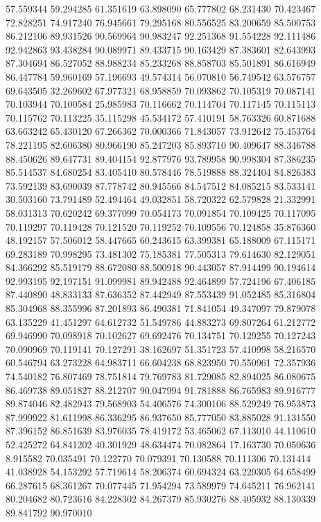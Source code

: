57.559344
59.294285
61.351619
63.898090
65.777802
68.231430
70.423467
72.828251
74.917240
76.945661
79.295168
80.556525
83.200659
85.500753
86.212106
89.931526
90.569964
90.983247
92.251368
91.554228
92.111486
92.942863
93.438284
90.089971
89.433715
90.163429
87.383601
82.643993
87.304694
86.527052
88.988234
85.233268
88.858703
85.501891
86.616949
86.447784
59.960169
57.196693
49.574314
56.070810
56.749542
63.576757
69.643505
32.269602
67.977321
68.958859
70.093862
70.105319
70.087141
70.103944
70.100584
25.985983
70.116662
70.114704
70.117145
70.115113
70.115762
70.113225
35.115298
45.534172
57.410191
58.763326
60.871688
63.663242
65.430120
67.266362
70.000366
71.843057
73.912642
75.453764
78.221195
82.606380
80.966190
85.247203
85.893710
90.409647
88.346788
88.450626
89.647731
89.404154
92.877976
93.789958
90.998304
87.386235
85.514537
84.680254
83.405410
80.578446
78.519888
88.324404
84.826383
73.592139
83.690039
87.778742
80.945566
84.547512
84.085215
83.533141
30.503160
73.791489
52.494464
49.032851
58.720322
62.579828
21.332991
58.031313
70.620242
69.377099
70.054173
70.091854
70.109425
70.117095
70.119297
70.119428
70.121520
70.119252
70.109556
70.124858
35.876360
48.192157
57.506012
58.447665
60.243615
63.399381
65.188009
67.115171
69.283189
70.998295
73.481302
75.185381
77.505313
79.614630
82.129051
84.366292
85.519179
88.672080
88.500918
90.443057
87.914499
90.194614
92.993195
92.197151
91.099981
89.942488
92.464899
57.724196
67.406185
87.440890
48.833133
87.636352
87.442949
87.553439
91.052485
85.316804
85.304968
88.355996
87.201893
86.490381
71.841054
49.347097
79.879078
63.135229
41.451297
64.612732
51.549786
44.883273
69.807264
61.212772
69.946990
70.098918
70.102627
69.692476
70.134751
70.129255
70.127243
70.090969
70.119141
70.127291
38.162697
51.351723
57.410998
58.216570
60.546794
63.273228
64.983711
66.604238
68.823950
70.550961
72.357936
74.540182
76.807469
78.751814
79.769783
81.729085
82.894025
86.080675
86.469738
89.051827
88.212707
90.047994
91.781888
86.765983
89.916777
89.874046
82.482943
79.568903
54.406576
74.300106
88.529249
76.953873
87.999922
81.611998
86.336295
86.937650
85.777050
83.885028
91.131550
87.396152
86.851639
83.976035
78.419172
53.465062
67.113010
44.110610
52.425272
64.841202
40.301929
48.634474
70.082864
17.163730
70.050636
8.915582
70.035491
70.122770
70.079391
70.130588
70.111306
70.131414
41.038928
54.153292
57.719614
58.206374
60.694324
63.229305
64.658499
66.287615
68.361267
70.077445
71.954294
73.589979
74.645211
76.962141
80.204682
80.723616
84.228302
84.267379
85.930276
88.405932
88.130339
89.841792
90.970010
